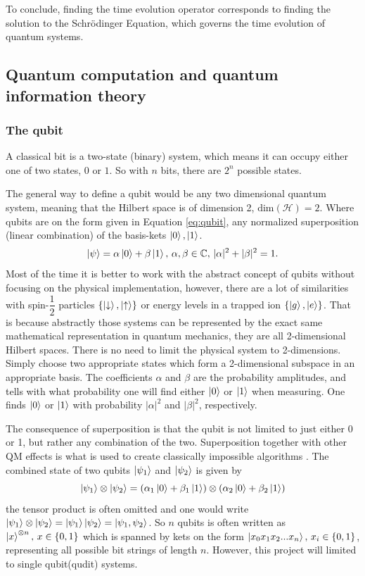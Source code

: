 To conclude, finding the time evolution operator corresponds to finding the solution to the Schrödinger Equation, which governs the time evolution of quantum systems.

\subsection{Quantum computation and quantum information theory}
\subsubsection{The qubit}
A classical bit is a two-state (binary) system, which means it can occupy either one of two states, $0$ or $1$. So with $n$ bits, there are $2^n$ possible states.

The general way to define a qubit would be any two dimensional quantum system, meaning that the Hilbert space is of dimension 2, $\text{dim}(\mathcal{H}) = 2$. Where qubits are on the form given in Equation \ref{eq:qubit}, any normalized superposition (linear combination) of the basis-kets $\ket{0},\ket{1}$.
\begin{equation}
\label{eq:qubit}
\ket{\psi} = \alpha\ket{0} + \beta\ket{1},\,\alpha,\beta \in \mathbb{C},\, |\alpha|^2 + |\beta|^2 = 1.
\end{equation}
Most of the time it is better to work with the abstract concept of qubits without focusing on the physical implementation, however, there are a lot of similarities with spin-$\dfrac{1}{2}$ particles $\{\ket{\downarrow},\ket{\uparrow}\}$ or energy levels in a trapped ion $\{\ket{g},\ket{e}\}$. That is because abstractly those systems can be represented by the exact same mathematical representation in quantum mechanics, they are all 2-dimensional Hilbert spaces. There is no need to limit the physical system to 2-dimensions. Simply choose two appropriate states which form a 2-dimensional subspace in an appropriate basis. The coefficients $\alpha$ and $\beta$ are the probability amplitudes, and tells with what probability one will find either $\ket{0}$ or $\ket{1}$ when measuring. One finds $\ket{0}$ or $\ket{1}$ with probability $|\alpha|^2$ and $|\beta|^2$, respectively.

The consequence of superposition is that the qubit is not limited to just either 0 or 1, but rather any combination of the two. Superposition together with other QM effects is what is used to create classically impossible algorithms \cite{shor,Grover}. The combined state of two qubits $\ket{\psi_1}$ and $\ket{\psi_2}$ is given by 
\begin{equation}
\ket{\psi_1} \otimes \ket{\psi_2} = (\alpha_1\ket{0} + \beta_1\ket{1})\otimes(\alpha_2\ket{0} + \beta_2\ket{1})
\end{equation}
the tensor product is often omitted and one would write $\ket{\psi_1} \otimes \ket{\psi_2} = \ket{\psi_1}\ket{\psi_2} = \ket{\psi_1, \psi_2}$.
So $n$ qubits is often written as $\ket{x}^{\otimes n},\, x \in \{0,1\}$ which is spanned by kets on the form $\ket{x_0x_1x_2...x_n},\, x_i \in \{0,1\}$, representing all possible bit strings of length $n$. However, this project will limited to single qubit(qudit) systems.

